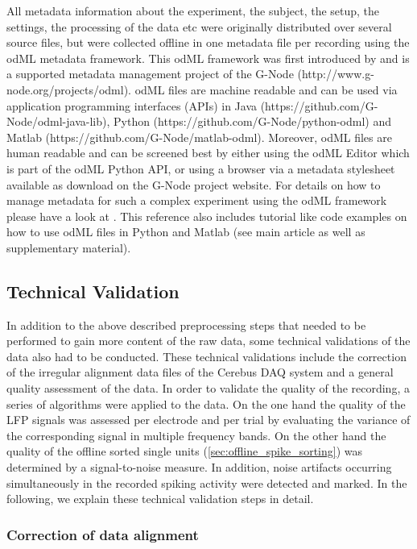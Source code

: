 { All metadata information about the experiment, the subject, the setup, the settings, the processing of the data etc were originally distributed over several source files, but were collected offline in one metadata file per recording using the odML metadata framework. This odML framework was first introduced by \citet{Grewe_2011} and is a supported metadata management project of the G-Node (http://www.g-node.org/projects/odml). odML files are machine readable and can be used via application programming interfaces (APIs) in Java (https://github.com/G-Node/odml-java-lib), Python (https://github.com/G-Node/python-odml) and Matlab (https://github.com/G-Node/matlab-odml). Moreover, odML files are human readable and can be screened best by either using the odML Editor which is part of the odML Python API, or using a browser via a metadata stylesheet available as download on the G-Node project website. For details on how to manage metadata for such a complex experiment using the odML framework please have a look at \citet{Zehl_2016}. This reference also includes tutorial like code examples on how to use odML files in Python and Matlab (see main article as well as supplementary material).

\subsection{Technical Validation}

In addition to the above described preprocessing steps that needed to be performed to gain more content of the raw data, some technical validations of the data also had to be conducted. These technical validations include the correction of the irregular alignment data files of the Cerebus DAQ system and a general quality assessment of the data. In order to validate the quality of the recording, a series of algorithms were applied to the data. On the one hand the quality of the LFP signals was assessed per electrode and per trial by evaluating the variance of the corresponding signal in multiple frequency bands. On the other hand the quality of the offline sorted single units (\cref{sec:offline_spike_sorting}) was determined by a signal-to-noise measure. In addition, noise artifacts occurring simultaneously in the recorded spiking activity were detected and marked. In the following, we explain these technical validation steps in detail.

\subsubsection{Correction of data alignment}

}
